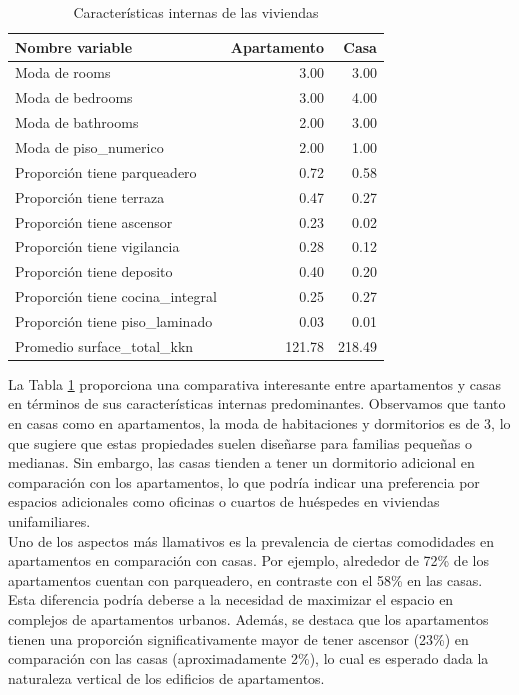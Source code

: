 \documentclass[12pt]{article}
\begin{document}
\begin{table}
\centering
\caption{Características internas de las viviendas}
\label{tab:caracteristicas_internas}
\begin{tabular}{|l|r|r|}
\hline
Nombre variable &  Apartamento &   Casa \\
\hline
Moda de rooms                    &         3.00 &   3.00 \\
Moda de bedrooms                 &         3.00 &   4.00 \\
Moda de bathrooms                &         2.00 &   3.00 \\
Moda de piso\_numerico            &         2.00 &   1.00 \\
Proporción tiene parqueadero     &         0.72 &   0.58 \\
Proporción tiene terraza         &         0.47 &   0.27 \\
Proporción tiene ascensor        &         0.23 &   0.02 \\
Proporción tiene vigilancia      &         0.28 &   0.12 \\
Proporción tiene deposito        &         0.40 &   0.20 \\
Proporción tiene cocina\_integral &         0.25 &   0.27 \\
Proporción tiene piso\_laminado   &         0.03 &   0.01 \\
Promedio surface\_total\_kkn       &       121.78 & 218.49 \\
\hline
\end{tabular}
\end{table}


La Tabla \ref{tab:caracteristicas_internas} proporciona una comparativa interesante entre apartamentos y casas en términos de sus características internas predominantes. Observamos que tanto en casas como en apartamentos, la moda de habitaciones y dormitorios es de 3, lo que sugiere que estas propiedades suelen diseñarse para familias pequeñas o medianas. Sin embargo, las casas tienden a tener un dormitorio adicional en comparación con los apartamentos, lo que podría indicar una preferencia por espacios adicionales como oficinas o cuartos de huéspedes en viviendas unifamiliares. \\

Uno de los aspectos más llamativos es la prevalencia de ciertas comodidades en apartamentos en comparación con casas. Por ejemplo, alrededor de 72\%  de los apartamentos cuentan con parqueadero, en contraste con el 58\%  en las casas. Esta diferencia podría deberse a la necesidad de maximizar el espacio en complejos de apartamentos urbanos. Además, se destaca que los apartamentos tienen una proporción significativamente mayor de tener ascensor (23\%) en comparación con las casas (aproximadamente 2\%), lo cual es esperado dada la naturaleza vertical de los edificios de apartamentos. \\
\end{document}
